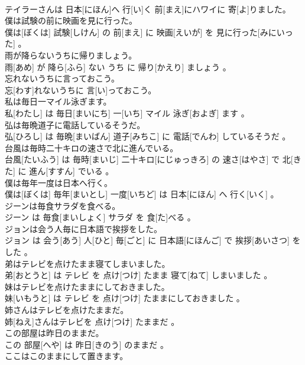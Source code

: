 \documentclass[8pt]{extreport}
\begin{document}
\begin{CJK}{UTF8}{min}
\\	テイラーさんは 日本[にほん]へ 行[い]く 前[まえ]にハワイに 寄[よ]りました。
\\	僕は試験の前に映画を見に行った。	
\\	僕は[ぼくは] 試験[しけん] の 前[まえ] に 映画[えいが] を 見に行った[みにいった] 。
\\	雨が降らないうちに帰りましょう。	
\\	雨[あめ] が 降ら[ふら] ない うち に 帰り[かえり] ましょう 。
\\	忘れないうちに言っておこう。	
\\	忘[わす]れないうちに 言[い]っておこう。
\\	私は毎日一マイル泳ぎます。	
\\	私[わたし] は 毎日[まいにち] 一[いち] マイル 泳ぎ[およぎ] ます 。
\\	弘は毎晩道子に電話しているそうだ。	
\\	弘[ひろし] は 毎晩[まいばん] 道子[みちこ] に 電話[でんわ] しているそうだ 。
\\	台風は毎時二十キロの速さで北に進んでいる。	
\\	台風[たいふう] は 毎時[まいじ] 二十キロ[にじゅっきろ] の 速さ[はやさ] で 北[きた] に 進ん[すすん] でいる 。
\\	僕は毎年一度は日本へ行く。	
\\	僕は[ぼくは] 毎年[まいとし] 一度[いちど] は 日本[にほん] へ 行く[いく] 。
\\	ジーンは毎食サラダを食べる。	
\\	ジーン は 毎食[まいしょく] サラダ を 食[た]べる 。
\\	ジョンは会う人毎に日本語で挨拶をした。	
\\	ジョン は 会う[あう] 人[ひと] 毎[ごと] に 日本語[にほんご] で 挨拶[あいさつ] をした 。
\\	弟はテレビを点けたまま寝てしまいました。	
\\	弟[おとうと] は テレビ を 点け[つけ] たまま 寝て[ねて] しまいました 。
\\	妹はテレビを点けたままにしておきました。	
\\	妹[いもうと] は テレビ を 点け[つけ] たままにしておきました 。
\\	姉さんはテレビを点けたままだ。	
\\	姉[ねえ]さんはテレビを 点け[つけ] たままだ 。
\\	この部屋は昨日のままだ。	
\\	この 部屋[へや] は 昨日[きのう] のままだ 。
\\	ここはこのままにして置きます。	

\end{CJK}
\end{document}
